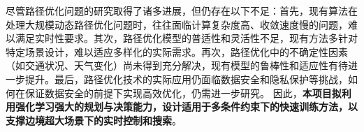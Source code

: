 尽管路径优化问题的研究取得了诸多进展，但仍存在以下不足：首先，现有算法在处理大规模动态路径优化问题时，往往面临计算复杂度高、收敛速度慢的问题，难以满足实时性要求。其次，路径优化模型的普适性和灵活性不足，现有方法多针对特定场景设计，难以适应多样化的实际需求。再次，路径优化中的不确定性因素（如交通状况、天气变化）尚未得到充分解决，现有模型的鲁棒性和适应性有待进一步提升。最后，路径优化技术的实际应用仍面临数据安全和隐私保护等挑战，如何在保证数据安全的前提下实现高效优化，仍需进一步研究。
因此，\textbf{本项目拟利用强化学习强大的规划与决策能力，设计适用于多条件约束下的快速训练方法，以支撑边境超大场景下的实时控制和搜索}。
